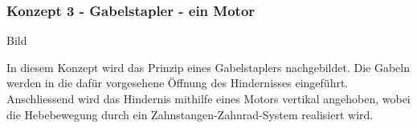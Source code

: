 \documentclass[main.tex]{subfiles} %
\begin{document}
\subsubsection*{Konzept 3 - Gabelstapler - ein Motor}

Bild \newline

In diesem Konzept wird das Prinzip eines Gabelstaplers nachgebildet. Die Gabeln werden in die dafür vorgesehene 
Öffnung des Hindernisses eingeführt. Anschliessend wird das Hindernis mithilfe eines Motors vertikal angehoben, 
wobei die Hebebewegung durch ein Zahnstangen-Zahnrad-System realisiert wird.
\end{document}

